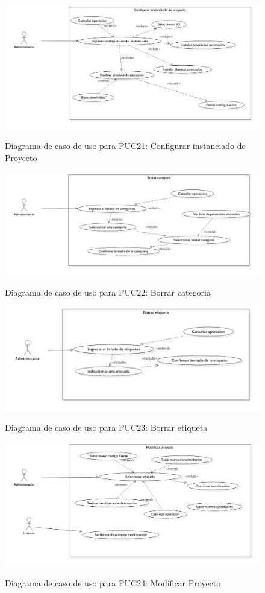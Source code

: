 \begin{figure}[!ht]
\includegraphics[width=\textwidth]{images/usecase/PUC21}
\label{FIG:CU_PUC21}
\caption{Diagrama de caso de uso para PUC21: Configurar instanciado de Proyecto}
\end{figure}

\begin{figure}[!ht]
\includegraphics[width=\textwidth]{images/usecase/PUC22}
\label{FIG:CU_PUC22}
\caption{Diagrama de caso de uso para PUC22: Borrar categor\`ia}
\end{figure}

\begin{figure}[!ht]
\includegraphics[width=\textwidth]{images/usecase/PUC23}
\label{FIG:CU_PUC23}
\caption{Diagrama de caso de uso para PUC23: Borrar etiqueta}
\end{figure}

\begin{figure}[!ht]
\includegraphics[width=\textwidth]{images/usecase/PUC24}
\label{FIG:CU_PUC24}
\caption{Diagrama de caso de uso para PUC24: Modificar Proyecto}
\end{figure}
